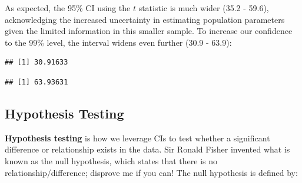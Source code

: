 \documentclass[]{book}
\newenvironment{Shaded}{\begin{snugshade}}{\end{snugshade}}
\newcommand{\CommentTok}[1]{\textcolor[rgb]{0.56,0.35,0.01}{\textit{#1}}}
\newcommand{\DecValTok}[1]{\textcolor[rgb]{0.00,0.00,0.81}{#1}}
\newcommand{\FloatTok}[1]{\textcolor[rgb]{0.00,0.00,0.81}{#1}}
\newcommand{\KeywordTok}[1]{\textcolor[rgb]{0.13,0.29,0.53}{\textbf{#1}}}
\newcommand{\NormalTok}[1]{#1}
\newcommand{\OperatorTok}[1]{\textcolor[rgb]{0.81,0.36,0.00}{\textbf{#1}}}
\newcommand{\StringTok}[1]{\textcolor[rgb]{0.31,0.60,0.02}{#1}}
\begin{document}
As expected, the 95\% CI using the \(t\) statistic is much wider (35.2 - 59.6), acknowledging the increased uncertainty in estimating population parameters given the limited information in this smaller sample. To increase our confidence to the 99\% level, the interval widens even further (30.9 - 63.9):

\begin{Shaded}
\end{Shaded}

\begin{Shaded}
\end{Shaded}

\begin{verbatim}
## [1] 30.91633
\end{verbatim}

\begin{Shaded}
\end{Shaded}

\begin{verbatim}
## [1] 63.93631
\end{verbatim}

\hypertarget{hypothesis-testing}{%
\subsection{Hypothesis Testing}\label{hypothesis-testing}}

\textbf{Hypothesis testing} is how we leverage CIs to test whether a significant difference or relationship exists in the data. Sir Ronald Fisher invented what is known as the null hypothesis, which states that there is no relationship/difference; disprove me if you can! The null hypothesis is defined by:
\end{document}
